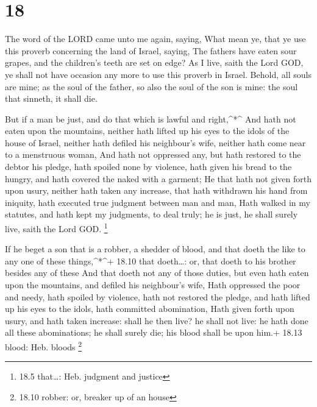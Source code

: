 \hypertarget{section-17}{%
\section{18}\label{section-17}}

 The word of the LORD came unto me again, saying,
 What mean ye, that ye use this proverb concerning the land
of Israel, saying, The fathers have eaten sour grapes, and the
children's teeth are set on edge?  As I live, saith the Lord
GOD, ye shall not have occasion any more to use this proverb in Israel.
 Behold, all souls are mine; as the soul of the father, so
also the soul of the son is mine: the soul that sinneth, it shall die.

 But if a man be just, and do that which is lawful and
right,\^{}*\^{}  And hath not eaten upon the mountains,
neither hath lifted up his eyes to the idols of the house of Israel,
neither hath defiled his neighbour's wife, neither hath come near to a
menstruous woman,  And hath not oppressed any, but hath
restored to the debtor his pledge, hath spoiled none by violence, hath
given his bread to the hungry, and hath covered the naked with a
garment;  He that hath not given forth upon usury, neither
hath taken any increase, that hath withdrawn his hand from iniquity,
hath executed true judgment between man and man,  Hath
walked in my statutes, and hath kept my judgments, to deal truly; he is
just, he shall surely live, saith the Lord GOD. \footnote{18.5
  that\ldots: Heb. judgment and justice}

 If he beget a son that is a robber, a shedder of blood,
and that doeth the like to any one of these things,\^{}*\^{}+ 18.10 that
doeth\ldots: or, that doeth to his brother besides any of these
 And that doeth not any of those duties, but even hath
eaten upon the mountains, and defiled his neighbour's wife,
 Hath oppressed the poor and needy, hath spoiled by
violence, hath not restored the pledge, and hath lifted up his eyes to
the idols, hath committed abomination,  Hath given forth
upon usury, and hath taken increase: shall he then live? he shall not
live: he hath done all these abominations; he shall surely die; his
blood shall be upon him.+ 18.13 blood: Heb. bloods \footnote{18.10
  robber: or, breaker up of an house}

